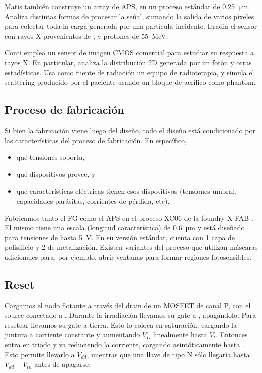 Matis\cite{matis_charged_2003} también construye un array de APS,
en un proceso estándar de \SI{0.25}{\micro\meter}.
Analiza distintas formas de procesar la señal,
sumando la salida de varios píxeles para colectar toda la carga generada por
una partícula incidente.
Irradia el sensor con rayos X provenientes de ,
y protones de \SI{55}{\mega\electronvolt}.

Conti\cite{conti_use_2013} emplea un sensor de imagen CMOS comercial
para estudiar su respuesta a rayos X.
En particular, analiza la distribución 2D generada por un fotón
y otras estadísticas.
Usa como fuente de radiación un equipo de radioterapia,
y simula el scattering producido por el paciente usando un bloque de acrílico
como phantom.
%
\subsection{Proceso de fabricación}
Si bien la fabricación viene luego del diseño,
todo el diseño está condicionado por 
las características del proceso de fabricación.
En específico,
\begin{itemize}
    \item qué tensiones soporta,
    \item qué dispositivos provee, y
    \item qué características eléctricas tienen esos dispositivos
        (tensiones umbral, capacidades parásitas, corrientes de pérdida, etc).
\end{itemize}

Fabricamos tanto el FG como el APS en el proceso XC06 de la foundry X-FAB
\cite{x-fab_0.6_2008}.
El mismo tiene una escala (longitud característica) de \SI{0.6}{\micro\meter} y está diseñado para
tensiones de hasta \SI{5}{\volt}.
En su versión estándar, 
cuenta con 1 capa de polisilicio y 2 de metalización.
Existen variantes del proceso que utilizan máscaras adicionales para,
por ejemplo, abrir ventanas para formar regiones fotosensibles.
\subsection{Reset}
Cargamos el nodo flotante a través del drain de un MOSFET de canal P,
con el source conectado a \vdd.
Durante la irradiación llevamos su gate a \vdd, apagándolo.
Para resetear 
llevamos su gate a tierra.
Esto lo coloca en saturación,
cargando la juntura a corriente constante 
y aumentando $V_D$ linealmente hasta $V_t$.
Entonces entra en triodo y va reduciendo la corriente,
cargando asintóticamente hasta \vdd.
Esto permite llevarlo a $V_{dd}$,
mientras que una llave de tipo N sólo llegaría hasta $V_{dd}-V_{tn}$ antes de
apagarse.

